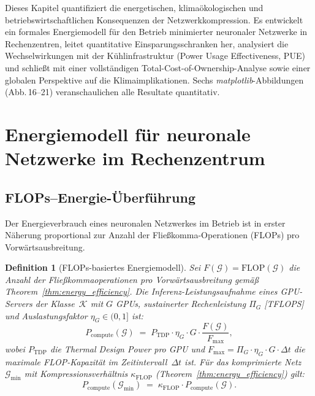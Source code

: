 \documentclass[12pt, a4paper, openany]{report}
\newtheorem{definition}[theorem]{Definition}
\newcommand{\calG}{\mathcal{G}}
\begin{document}
Dieses Kapitel quantifiziert die energetischen, klimaökologischen und
betriebswirtschaftlichen Konsequenzen der Netzwerkkompression.  Es entwickelt
ein formales Energiemodell für den Betrieb minimierter neuronaler Netzwerke
in Rechenzentren, leitet quantitative Einsparungsschranken her, analysiert
die Wechselwirkungen mit der Kühlinfrastruktur (Power Usage Effectiveness,
PUE) und schließt mit einer vollständigen Total-Cost-of-Ownership-Analyse
sowie einer globalen Perspektive auf die Klimaimplikationen.  Sechs
\textit{matplotlib}-Abbildungen (Abb.\,16--21) veranschaulichen alle
Resultate quantitativ.

\section{Energiemodell für neuronale Netzwerke im Rechenzentrum}
\label{sec:energy_model}

\subsection{FLOPs--Energie-Überführung}

Der Energieverbrauch eines neuronalen Netzwerkes im Betrieb ist in erster
Näherung proportional zur Anzahl der Fließkomma-Operationen (FLOPs) pro
Vorwärtsausbreitung.

\begin{definition}[FLOPs-basiertes Energiemodell]
\label{def:flop_energy}
Sei $F(\calG) = \mathrm{FLOP}(\calG)$ die Anzahl der Fließkommaoperationen
pro Vorwärtsausbreitung gemäß Theorem~\ref{thm:energy_efficiency}.  Die
\emph{Inferenz-Leistungsaufnahme} eines GPU-Servers der Klasse~$\mathcal{K}$
mit $G$ GPUs, sustainerter Rechenleistung $\Pi_G$ [TFLOPS] und
Auslastungsfaktor $\eta_G \in (0,1]$ ist:
\begin{equation}
  \label{eq:compute_power}
  P_{\mathrm{compute}}(\calG)
  \;=\;
  P_{\mathrm{TDP}} \cdot \eta_G \cdot G \cdot
  \frac{F(\calG)}{F_{\mathrm{max}}},
\end{equation}
wobei $P_{\mathrm{TDP}}$ die Thermal Design Power pro GPU und
$F_{\mathrm{max}} = \Pi_G \cdot \eta_G \cdot G \cdot \Delta t$ die maximale
FLOP-Kapazität im Zeitintervall~$\Delta t$ ist.  Für das komprimierte
Netz $\calG_{\min}$ mit Kompressionsverhältnis $\kappa_{\mathrm{FLOP}}$
(Theorem~\ref{thm:energy_efficiency}) gilt:
\begin{equation}
  \label{eq:compute_power_compressed}
  P_{\mathrm{compute}}(\calG_{\min})
  \;=\;
  \kappa_{\mathrm{FLOP}} \cdot P_{\mathrm{compute}}(\calG).
\end{equation}
\end{definition}
\end{document}
